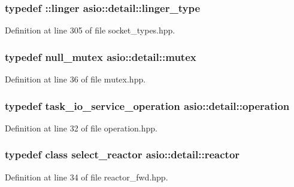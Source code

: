 \subsubsection[{linger\+\_\+type}]{\setlength{\rightskip}{0pt plus 5cm}typedef \+::linger {\bf asio\+::detail\+::linger\+\_\+type}}\label{namespaceasio_1_1detail_a417cb909eef0654a2e53adc1f4dd2dc1}


Definition at line 305 of file socket\+\_\+types.\+hpp.

\hypertarget{namespaceasio_1_1detail_a5740d9cd098ece66556d1e8644cf3060}{}
\subsubsection[{mutex}]{\setlength{\rightskip}{0pt plus 5cm}typedef {\bf null\+\_\+mutex} {\bf asio\+::detail\+::mutex}}\label{namespaceasio_1_1detail_a5740d9cd098ece66556d1e8644cf3060}


Definition at line 36 of file mutex.\+hpp.

\hypertarget{namespaceasio_1_1detail_a338968609bec20e37145309f8f9ec936}{}
\subsubsection[{operation}]{\setlength{\rightskip}{0pt plus 5cm}typedef task\+\_\+io\+\_\+service\+\_\+operation {\bf asio\+::detail\+::operation}}\label{namespaceasio_1_1detail_a338968609bec20e37145309f8f9ec936}


Definition at line 32 of file operation.\+hpp.

\hypertarget{namespaceasio_1_1detail_a84c582743740f1d6b19111c88e2922bd}{}
\subsubsection[{reactor}]{\setlength{\rightskip}{0pt plus 5cm}typedef class {\bf select\+\_\+reactor} {\bf asio\+::detail\+::reactor}}\label{namespaceasio_1_1detail_a84c582743740f1d6b19111c88e2922bd}


Definition at line 34 of file reactor\+\_\+fwd.\+hpp.

\hypertarget{namespaceasio_1_1detail_af134b6407cc041a03d1c0b8821ae00c1}{}

